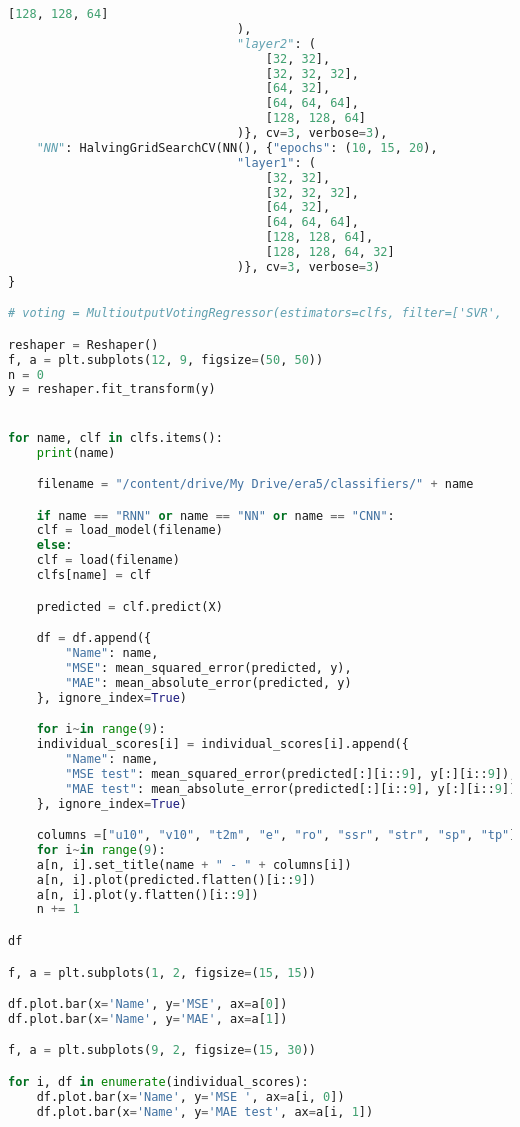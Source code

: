 \begin{lstlisting}[label=python-listing,caption={Kod źródłowy},language=python]
                                    [128, 128, 64]
                                ), 
                                "layer2": (
                                    [32, 32],
                                    [32, 32, 32],
                                    [64, 32],
                                    [64, 64, 64],
                                    [128, 128, 64]
                                )}, cv=3, verbose=3),
    "NN": HalvingGridSearchCV(NN(), {"epochs": (10, 15, 20), 
                                "layer1": (
                                    [32, 32],
                                    [32, 32, 32],
                                    [64, 32],
                                    [64, 64, 64],
                                    [128, 128, 64],
                                    [128, 128, 64, 32]
                                )}, cv=3, verbose=3)
}

# voting = MultioutputVotingRegressor(estimators=clfs, filter=['SVR', 'Logistic Regression', 'SGD', 'PLS', 'Random Forest', 'MLP', 'RNN', 'CNN', 'NN'])

reshaper = Reshaper()
f, a = plt.subplots(12, 9, figsize=(50, 50))
n = 0
y = reshaper.fit_transform(y)


for name, clf in clfs.items():
    print(name)

    filename = "/content/drive/My Drive/era5/classifiers/" + name

    if name == "RNN" or name == "NN" or name == "CNN":
    clf = load_model(filename)
    else:
    clf = load(filename)
    clfs[name] = clf

    predicted = clf.predict(X)

    df = df.append({
        "Name": name,
        "MSE": mean_squared_error(predicted, y),
        "MAE": mean_absolute_error(predicted, y)
    }, ignore_index=True)

    for i~in range(9):
    individual_scores[i] = individual_scores[i].append({
        "Name": name,
        "MSE test": mean_squared_error(predicted[:][i::9], y[:][i::9]),
        "MAE test": mean_absolute_error(predicted[:][i::9], y[:][i::9])
    }, ignore_index=True)

    columns =["u10", "v10", "t2m", "e", "ro", "ssr", "str", "sp", "tp"]
    for i~in range(9):
    a[n, i].set_title(name + " - " + columns[i])
    a[n, i].plot(predicted.flatten()[i::9])
    a[n, i].plot(y.flatten()[i::9])
    n += 1

df

f, a = plt.subplots(1, 2, figsize=(15, 15))

df.plot.bar(x='Name', y='MSE', ax=a[0])
df.plot.bar(x='Name', y='MAE', ax=a[1])

f, a = plt.subplots(9, 2, figsize=(15, 30))

for i, df in enumerate(individual_scores):
    df.plot.bar(x='Name', y='MSE ', ax=a[i, 0])
    df.plot.bar(x='Name', y='MAE test', ax=a[i, 1])
\end{lstlisting}